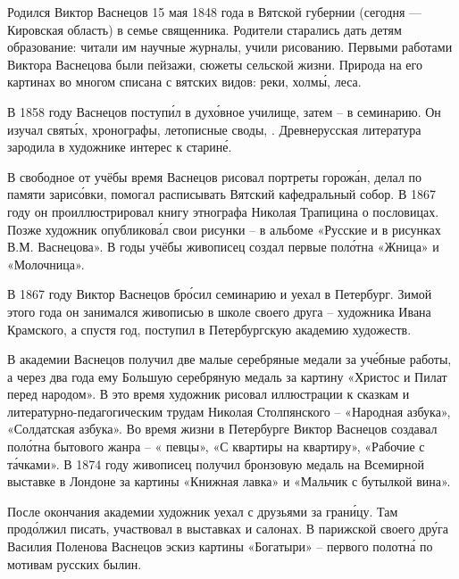 Родился Виктор Васнецов 15 мая 1848 года в Вятской губернии (сегодня --- Кировская область) в семье священника. Родители старались дать детям  образование: читали им научные журналы, учили рисованию. Первыми работами Виктора Васнецова были пейзажи, сюжеты сельской жизни. Природа на его картинах во многом списана с вятских видов:  реки, холм\'{ы},   леса.

В 1858 году Васнецов поступ\'{и}л в дух\'{о}вное училище, затем -- в семинарию. Он изучал  свят\'{ы}х, хронографы, летописные своды, . Древнерусская литература зародила в художнике интерес к старин\'{е}.

В свободное от учёбы время Васнецов рисовал портреты горож\'{а}н, делал по памяти зарис\'{о}вки, помогал расписывать Вятский кафедральный собор. В 1867 году он проиллюстрировал книгу этнографа Николая Трапицина о пословицах. Позже художник опубликов\'{а}л свои рисунки  -- в альбоме «Русские  и  в рисунках В.М. Васнецова». В годы учёбы живописец создал первые пол\'{о}тна «Жница» и «Молочница».

В 1867 году Виктор Васнецов бр\'{о}сил семинарию и уехал в Петербург. Зимой этого года он занимался живописью в школе своего друга -- художника Ивана Крамского, а спустя год, поступил в Петербургскую академию художеств.

В академии Васнецов получил две малые серебряные медали за уч\'{е}бные работы, а через два года ему  Большую серебряную медаль за картину «Христос и Пилат перед народом». В это время художник рисовал иллюстрации к сказкам и литературно-педагогическим трудам Николая Столпянского -- «Народная азбука», «Солдатская азбука». Во время жизни в Петербурге Виктор Васнецов создавал пол\'{о}тна бытового жанра -- « певцы», «С квартиры на квартиру», «Рабочие с т\'{а}чками». В 1874 году живописец получил бронзовую медаль на Всемирной выставке в Лондоне за картины «Книжная лавка» и «Мальчик с бутылкой вина».

После окончания академии художник уехал с друзьями за гран\'{и}цу. Там прод\'{о}лжил писать, участвовал в выставках и салонах. В парижской  своего др\'{у}га Василия Поленова Васнецов  эскиз картины «Богатыри» -- первого полотн\'{а} по мотивам русских былин.

